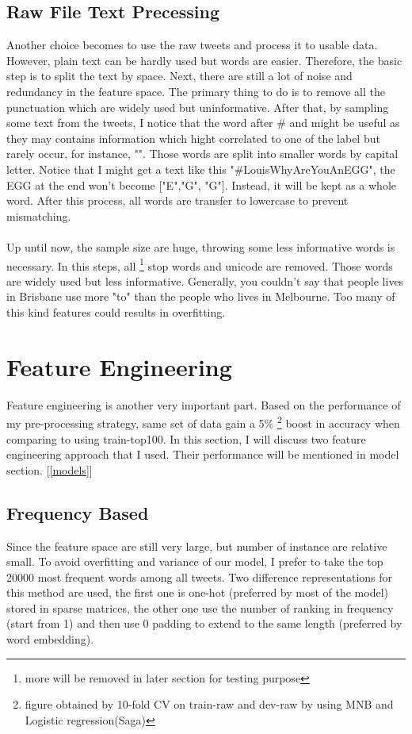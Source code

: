\documentclass[11pt]{article}
\begin{document}
\subsection{Raw File Text Precessing}
Another choice becomes to use the raw tweets and process it to
usable data. However, plain text can be hardly used but words are easier. 
Therefore, the basic step is to split the text by space. Next, 
there are still a lot of noise and redundancy in the feature space.
The primary thing to do is to remove all the punctuation
which are widely used but uninformative.
After that, by sampling some text from the tweets, I notice that the 
word after
\# and \@ might be useful as they may contains information which
hight correlated to one of the label but rarely occur, 
for instance, "". Those words are split into smaller words by capital letter. 
Notice that I might get a text like this "\#LouisWhyAreYouAnEGG", the EGG at the
end won't become ["E","G", "G"]. Instead, it will be kept as a whole word. 
After this process, all words are transfer to lowercase to 
prevent mismatching.
\\
\\
Up until now, the sample size are huge, throwing some less 
informative words is necessary. In this steps, all
\footnote{more will be removed in later section for testing purpose} stop words
and unicode are removed.
Those words are widely used but less informative. Generally, you couldn't say that
people lives in Brisbane use more "to" than the people who lives in Melbourne. Too many 
of this kind features could results in overfitting.

\section{Feature Engineering}
\label{ext}
Feature engineering is another very important part.
Based on the performance of my pre-processing strategy, 
same set of data gain a 5\% 
\footnote{figure obtained by 10-fold CV on train-raw and dev-raw 
by using MNB and Logistic regression(Saga)}
boost in accuracy when comparing to using train-top100.
In this section, I will discuss two feature engineering approach that
I used. Their performance will be mentioned in model section.
[\ref{models}]

\subsection{Frequency Based}
Since the feature space are still very large, but number of instance
are relative small. To avoid overfitting and variance of our model, 
I prefer to take the top 20000 most frequent words among all tweets. 
Two difference representations for this method are
used, the first one is one-hot (preferred by most of the model) stored in 
sparse matrices, the other one use the number of ranking in frequency 
(start from 1) and then use 
0 padding to extend to the same length (preferred by word embedding).
\end{document}

